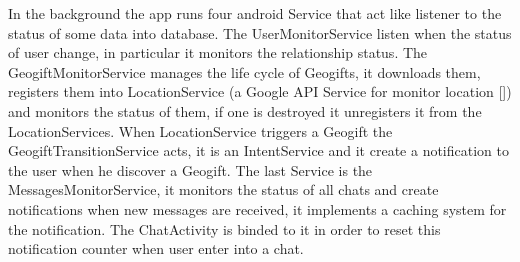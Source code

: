 In the background the app runs four android Service that act like listener to the status of some data into database. 
The UserMonitorService listen when the status of user change, in particular it monitors the relationship status. 
The GeogiftMonitorService manages the life cycle of Geogifts, it downloads them, registers them into LocationService (a Google API Service for monitor location []) and monitors the status of them, if one is destroyed it unregisters it from the LocationServices. When LocationService triggers a Geogift the GeogiftTransitionService acts, it is an IntentService and it create a notification to the user when he discover a Geogift. 
The last Service is the MessagesMonitorService, it monitors the status of all chats and create notifications when new messages are received, it implements a caching system for the notification. The ChatActivity is binded to it in order to reset this notification counter when user enter into a chat.
